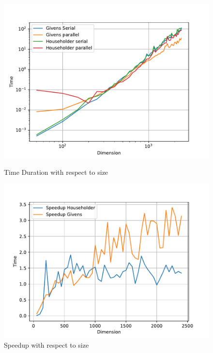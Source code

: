 \documentclass{article}
\begin{document}
    \begin{figure}[htbp]
    \begin{minipage}{0.3\textwidth}
        \centering
        \includegraphics[width=\textwidth]{timeQR.pdf}
        \caption{Time Duration with respect to size}
        \label{fig:timeQR}
    \end{minipage}%
    \hfill
    \begin{minipage}{0.3\textwidth}
        \centering
        \includegraphics[width=\textwidth]{SpeedUpQR.pdf}
        \caption{Speedup with respect to size}
        \label{fig:spQR}
    \end{minipage}%
    \hfill
    \begin{minipage}{0.3\textwidth}

\end{minipage}
\end{figure}
\end{document}
